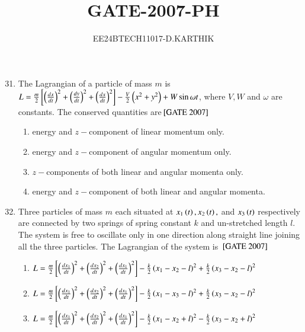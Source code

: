 \documentclass[journal]{IEEEtran}
\begin{document}

\vspace{3cm}

\title{GATE-2007-PH}
\author{EE24BTECH11017-D.KARTHIK}
\maketitle

\renewcommand{\thefigure}{\theenumi}
\renewcommand{\thetable}{\theenumi}
\setlength{\intextsep}{10pt}


\renewcommand{\thetable}{\theenumi}

\begin{enumerate}
\setcounter{enumi}{30}  
    \item The Lagrangian of a particle of mass $m$ is $L = \frac{m}{2}{}\left[\left(\frac{dx}{dt}\right)^2 +\left(\frac{dy}{dt}\right)^2 +\left(\frac{dx}{dt}\right)^2\right]-\frac{V}{2}\left(x^2+y^2\right)+W\sin{\omega t}$, where $V,W$ and $\omega$ are constants. The conserved quantities are\hfill{${}\left[\text{GATE 2007}\right]$} \begin{enumerate}
    \item energy and $z-$component of linear momentum only.
    \item energy and $z-$component of angular momentum only. 
    \item $z-$components of both linear and angular momenta only.
    \item energy and $z-$component of both linear and angular momenta.
\end{enumerate}
\item Three particles of mass $m$ each situated at $x_1\left(t\right), x_2\left(t\right),$ and $x_3\left(t\right)$ respectively are connected by two springs of spring constant $k$ and un-stretched length $l$. The system is free to oscillate only in one direction along straight line joining all the three particles. The Lagrangian of the system is \hfill{${}\left[\text{GATE 2007}\right]$} 
\begin{enumerate}
    \item $L = \frac{m}{2}{}\left[\left(\frac{dx_1}{dt}\right)^2 +\left(\frac{dx_2}{dt}\right)^2 +\left(\frac{dx_1}{dt}\right)^2\right]-\frac{k}{2}\left(x_1-x_2-l\right)^2 + \frac{k}{2}\left(x_3 - x_2 - l\right)^2$
     \item $L = \frac{m}{2}{}\left[\left(\frac{dx_1}{dt}\right)^2 +\left(\frac{dx_2}{dt}\right)^2 +\left(\frac{dx_1}{dt}\right)^2\right]-\frac{k}{2}\left(x_1-x_3-l\right)^2 + \frac{k}{2}\left(x_3 - x_2 - l\right)^2$
      \item $L = \frac{m}{2}{}\left[\left(\frac{dx_1}{dt}\right)^2 +\left(\frac{dx_2}{dt}\right)^2 +\left(\frac{dx_1}{dt}\right)^2\right]-\frac{k}{2}\left(x_1-x_2+l\right)^2 - \frac{k}{2}\left(x_3 - x_2 + l\right)^2$

\end{enumerate}
\end{enumerate}
\end{document}
